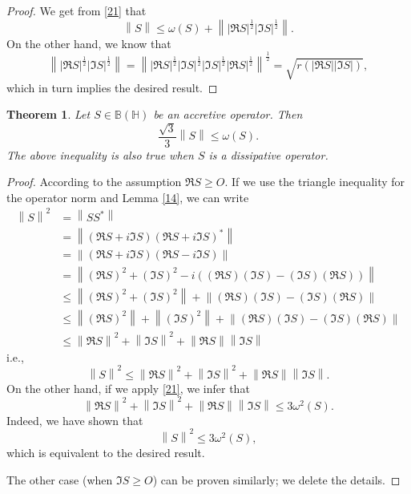 \documentclass[12pt,twoside,reqno]{amsart}
\newtheorem{theorem}{Theorem}[section]
\numberwithin{equation}{section}
\begin{document}
\begin{proof}
We get from \eqref{21} that
	\[\left\| S \right\|\le \omega \left( S \right)+\left\| {{\left| \Re S \right|}^{\frac{1}{2}}}{{\left| \Im S \right|}^{\frac{1}{2}}} \right\|.\]
On the other hand, we know that
	\[\left\| {{\left| \Re S \right|}^{\frac{1}{2}}}{{\left| \Im S \right|}^{\frac{1}{2}}} \right\|={{\left\| {{\left| \Re S \right|}^{\frac{1}{2}}}{{\left| \Im S \right|}^{\frac{1}{2}}}{{\left| \Im S \right|}^{\frac{1}{2}}}{{\left| \Re S \right|}^{\frac{1}{2}}} \right\|}^{\frac{1}{2}}}=\sqrt{r\left( \left| \Re S \right|\left| \Im S \right| \right)},\]
which in turn implies the desired result.
\end{proof}






\begin{theorem}\label{8}
Let $S\in \mathbb B\left( \mathbb H \right)$ be an accretive operator. Then
\[\frac{\sqrt{3}}{3}\left\| S \right\|\le \omega \left( S \right).\]
The above inequality is also true when $S$ is a dissipative operator.
\end{theorem}
\begin{proof}
According to the assumption $\Re S\ge O$. If we use the triangle inequality for the operator norm and Lemma \ref{14}, we can write
\[\begin{aligned}
   {{\left\| S \right\|}^{2}}&=\left\| S{{S}^{*}} \right\| \\ 
 & =\left\| \left( \Re S+i\Im S \right){{\left( \Re S+i\Im S \right)}^{*}} \right\| \\ 
 & =\left\| \left( \Re S+i\Im S \right)\left( \Re S-i\Im S \right) \right\| \\ 
 & =\left\| {{\left( \Re S \right)}^{2}}+{{\left( \Im S \right)}^{2}}-i\left( \left( \Re S \right)\left( \Im S \right)-\left( \Im S \right)\left( \Re S \right) \right) \right\| \\ 
 & \le\left\| {{\left( \Re S \right)}^{2}}+{{\left( \Im S \right)}^{2}} \right\|+\left\| \left( \Re S \right)\left( \Im S \right)-\left( \Im S \right)\left( \Re S \right) \right\| \\ 
 & \le \left\| {{\left( \Re S \right)}^{2}} \right\|+\left\| {{\left( \Im S \right)}^{2}} \right\|+\left\| \left( \Re S \right)\left( \Im S \right)-\left( \Im S \right)\left( \Re S \right) \right\| \\ 
 & \le {{\left\| \Re S \right\|}^{2}}+{{\left\| \Im S \right\|}^{2}}+\left\| \Re S \right\|\left\| \Im S \right\|  
\end{aligned}\]
i.e.,
\[{{\left\| S \right\|}^{2}}\le {{\left\| \Re S \right\|}^{2}}+{{\left\| \Im S \right\|}^{2}}+\left\| \Re S \right\|\left\| \Im S \right\|.\]
On the other hand, if we apply \eqref{21}, we infer that
\[{{\left\| \Re S \right\|}^{2}}+{{\left\| \Im S \right\|}^{2}}+\left\| \Re S \right\|\left\| \Im S \right\|\le 3{{\omega }^{2}}\left( S \right).\]
Indeed, we have shown that
\[{{\left\| S \right\|}^{2}}\le 3{{\omega }^{2}}\left( S \right),\]
which is equivalent to the desired result.

The other case (when $\Im S\ge O$) can be proven similarly; we delete the details.
\end{proof}
\end{document}
